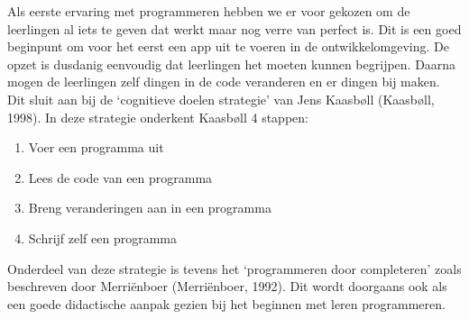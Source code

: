 \documentclass{BYUTextbook}
\begin{document}
Als eerste ervaring met programmeren hebben we er voor gekozen om de leerlingen al iets te geven dat werkt maar nog verre van perfect is. Dit is een goed beginpunt om voor het eerst een app uit te voeren in de ontwikkelomgeving. De opzet is dusdanig eenvoudig dat leerlingen het moeten kunnen begrijpen. Daarna mogen de leerlingen zelf dingen in de code veranderen en er dingen bij maken. Dit sluit aan bij de `cognitieve doelen strategie' van Jens Kaasb\o ll (Kaasb\o ll, 1998). In deze strategie onderkent Kaasb\o ll 4 stappen:
\begin{enumerate}
  \item Voer een programma uit
  \item Lees de code van een programma
  \item Breng veranderingen aan in een programma
  \item Schrijf zelf een programma
\end{enumerate}

Onderdeel van deze strategie is tevens het `programmeren door completeren' zoals beschreven door Merri\"{e}nboer (Merri\"{e}nboer, 1992). Dit wordt doorgaans ook als een goede didactische aanpak gezien bij het beginnen met leren programmeren.
\end{document}
